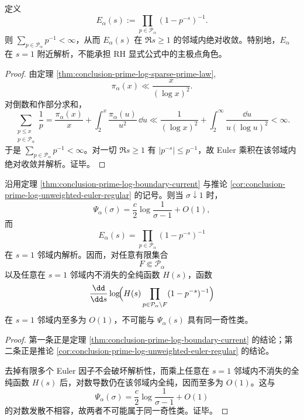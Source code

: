 \begin{corollary}\label{cor:conclusion-prime-log-unweighted-euler-regular}
定义
\[
E_\alpha(s):=\prod_{p\in\mathcal P_\alpha}(1-p^{-s})^{-1}.
\]
则 \(\sum_{p\in\mathcal P_\alpha}p^{-1}<\infty\)，从而 \(E_\alpha(s)\) 在 \(\Re s\ge 1\) 的邻域内绝对收敛。特别地，\(E_\alpha\) 在 \(s=1\) 附近解析，不能承担 RH 显式公式中的主极点角色。
\end{corollary}
\begin{proof}
由定理 \ref{thm:conclusion-prime-log-sparse-prime-law},
\[
\pi_\alpha(x)\ll \frac{x}{(\log x)^2}.
\]
对倒数和作部分求和，
\[
\sum_{\substack{p\le x\\ p\in\mathcal P_\alpha}}\frac1p
=
\frac{\pi_\alpha(x)}{x}
+
\int_2^x \frac{\pi_\alpha(u)}{u^2}\,\dd u
\ll
\frac1{(\log x)^2}
+
\int_2^\infty \frac{\dd u}{u(\log u)^2}
<\infty.
\]
于是 \(\sum_{p\in\mathcal P_\alpha}p^{-1}<\infty\)。对一切 \(\Re s\ge 1\) 有 \(|p^{-s}|\le p^{-1}\)，故 Euler 乘积在该邻域内绝对收敛并解析。证毕。
\end{proof}

\begin{theorem}\label{thm:conclusion-prime-log-singularity-vs-unweighted-euler-gap}
沿用定理 \ref{thm:conclusion-prime-log-boundary-current} 与推论 \ref{cor:conclusion-prime-log-unweighted-euler-regular} 的记号。则当 \(\sigma\downarrow 1\) 时，
\[
\Psi_\alpha(\sigma)=\frac{c}{2}\log\frac{1}{\sigma-1}+O(1),
\]
而
\[
E_\alpha(s)=\prod_{p\in \mathcal P_\alpha}(1-p^{-s})^{-1}
\]
在 \(s=1\) 邻域内解析。因而，对任意有限集合
\[
F\Subset \mathcal P_\alpha
\]
以及任意在 \(s=1\) 邻域内不消失的全纯函数 \(H(s)\)，函数
\[
\frac{\dd}{\dd s}\log\!\Bigl(H(s)\prod_{p\in \mathcal P_\alpha\setminus F}(1-p^{-s})^{-1}\Bigr)
\]
在 \(s=1\) 邻域内至多为 \(O(1)\)，不可能与 \(\Psi_\alpha(s)\) 具有同一奇性类。
\end{theorem}
\begin{proof}
第一条正是定理 \ref{thm:conclusion-prime-log-boundary-current} 的结论；第二条正是推论 \ref{cor:conclusion-prime-log-unweighted-euler-regular} 的结论。

去掉有限多个 Euler 因子不会破坏解析性，而乘上任意在 \(s=1\) 邻域内不消失的全纯函数 \(H(s)\) 后，对数导数仍在该邻域内全纯，因而至多为 \(O(1)\)。这与
\[
\Psi_\alpha(\sigma)=\frac{c}{2}\log\frac{1}{\sigma-1}+O(1)
\]
的对数发散不相容，故两者不可能属于同一奇性类。证毕。
\end{proof}

